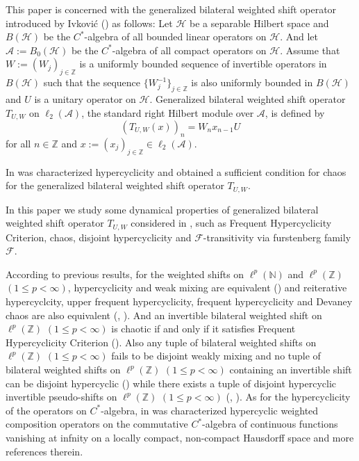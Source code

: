 \documentclass{article}
\begin{document}
This paper is concerned with the generalized bilateral weighted shift operator introduced by Ivkovi\'{c} (\cite{I24}) as follows: Let $\mathcal{H}$ be a separable Hilbert space and $B(\mathcal{H})$ be the $C^{\ast}$-algebra of all bounded linear operators on $\mathcal{H}$. And let $\mathcal{A}:=B_{0}(\mathcal{H})$ be the $C^{\ast}$-algebra of all compact operators on $\mathcal{H}$. Assume that $W:=(W_{j})_{j\in\mathbb{Z}}$ is a uniformly bounded sequence of invertible operators in $B(\mathcal{H})$ such that the sequence $\{W^{-1}_{j}\}_{j\in\mathbb{Z}}$ is also uniformly bounded in $B(\mathcal{H})$ and $U$ is a unitary operator on $\mathcal{H}$. Generalized bilateral weighted shift operator $T_{U, W}$ on $\ell_{2}(\mathcal{A})$, the standard right Hilbert module over $\mathcal{A}$, is defined by
\[(T_{U,W}(x))_{n}=W_{n}x_{n-1}U\]
for all $n\in\mathbb{Z}$ and $x:=(x_{j})_{j\in\mathbb{Z}}\in\ell_{2}(\mathcal{A})$.

In \cite{I24} was characterized hypercyclicity and obtained a sufficient condition for chaos for  the generalized bilateral weighted shift operator  $T_{U, W}$.

In this paper we study some dynamical properties of generalized bilateral weighted shift operator $T_{U, W}$  considered in \cite{I24}, such as Frequent Hypercyclicity Criterion, chaos, disjoint hypercyclicity and $\mathcal{F}$-transitivity via furstenberg family $\mathcal{F}$.

According to previous results, for the weighted shifts on $\ell^{p}(\mathbb{N})$ and $\ell^{p}(\mathbb{Z})$ $(1\leq p< \infty)$, hypercyclicity and weak mixing are equivalent (\cite{GM11}) and reiterative hypercyclcity, upper frequent hypercyclicity, frequent hypercyclicity and Devaney chaos are also equivalent (\cite{BR15}, \cite{BMPP16}).
And an invertible bilateral weighted shift on $\ell^{p}(\mathbb{Z})$ $(1\leq p< \infty)$ is chaotic if and only if it satisfies Frequent Hypercyclicity Criterion (\cite{BR15}).  Also any tuple of bilateral weighted shifts on $\ell^{p}(\mathbb{Z})$ $(1\leq p< \infty)$ fails to be disjoint weakly mixing and no tuple of bilateral weighted shifts on $\ell^{p}(\mathbb{Z})$ $(1\leq p< \infty)$ containing an invertible shift can be disjoint hypercyclic (\cite{BMS14}) while there exists a tuple of disjoint hypercyclic invertible pseudo-shifts on $\ell^{p}(\mathbb{Z})$ $(1\leq p< \infty)$ (\cite{R24}, \cite{BP07}). As for the hypercyclicity of the operators on
 $C^{\ast}$-algebra, in \cite{IT23} was characterized hypercyclic weighted composition operators on the
commutative $C^{\ast}$-algebra of continuous functions vanishing at infnity on a locally compact, non-compact
Hausdorff space and more references therein.
\end{document}
